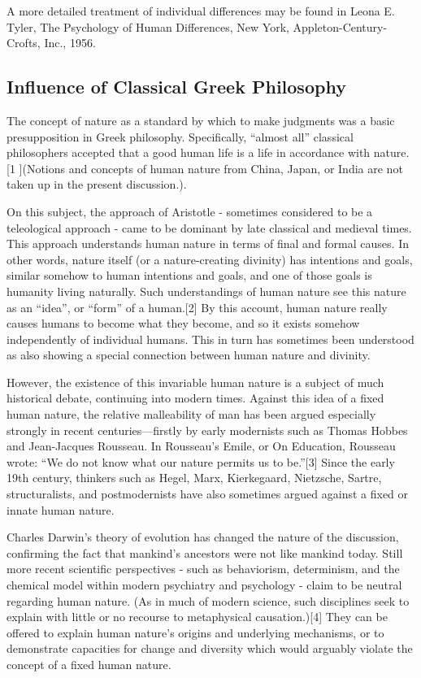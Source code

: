 A more detailed treatment of individual differences may be found in Leona E. Tyler, The Psychology of Human Differences, New York, Appleton-Century-Crofts, Inc., 1956. 

\subsection{Influence of Classical Greek Philosophy}

The concept of nature as a standard by which to make judgments was a basic presupposition in Greek philosophy. Specifically, ``almost all'' classical philosophers accepted that a good human life is a life in accordance with nature.[1 ](Notions and concepts of human nature from China, Japan, or India are not taken up in the present discussion.).

On this subject, the approach of Aristotle - sometimes considered to be a teleological approach - came to be dominant by late classical and medieval times. This approach understands human nature in terms of final and formal causes. In other words, nature itself (or a nature-creating divinity) has intentions and goals, similar somehow to human intentions and goals, and one of those goals is humanity living naturally. Such understandings of human nature see this nature as an ``idea'', or ``form'' of a human.[2] By this account, human nature really causes humans to become what they become, and so it exists somehow independently of individual humans. This in turn has sometimes been understood as also showing a special connection between human nature and divinity.

However, the existence of this invariable human nature is a subject of much historical debate, continuing into modern times. Against this idea of a fixed human nature, the relative malleability of man has been argued especially strongly in recent centuries—firstly by early modernists such as Thomas Hobbes and Jean-Jacques Rousseau. In Rousseau's Emile, or On Education, Rousseau wrote: ``We do not know what our nature permits us to be.''[3] Since the early 19th century, thinkers such as Hegel, Marx, Kierkegaard, Nietzsche, Sartre, structuralists, and postmodernists have also sometimes argued against a fixed or innate human nature.

Charles Darwin's theory of evolution has changed the nature of the discussion, confirming the fact that mankind's ancestors were not like mankind today. Still more recent scientific perspectives - such as behaviorism, determinism, and the chemical model within modern psychiatry and psychology - claim to be neutral regarding human nature. (As in much of modern science, such disciplines seek to explain with little or no recourse to metaphysical causation.)[4] They can be offered to explain human nature's origins and underlying mechanisms, or to demonstrate capacities for change and diversity which would arguably violate the concept of a fixed human nature.

